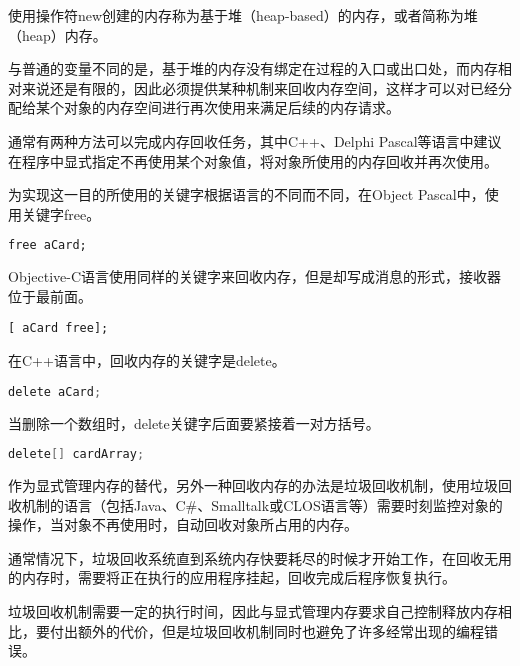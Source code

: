 使用操作符new创建的内存称为基于堆（heap-based）的内存，或者简称为堆（heap）内存。

与普通的变量不同的是，基于堆的内存没有绑定在过程的入口或出口处，而内存相对来说还是有限的，因此必须提供某种机制来回收内存空间，这样才可以对已经分配给某个对象的内存空间进行再次使用来满足后续的内存请求。

通常有两种方法可以完成内存回收任务，其中C++、Delphi Pascal等语言中建议在程序中显式指定不再使用某个对象值，将对象所使用的内存回收并再次使用。

为实现这一目的所使用的关键字根据语言的不同而不同，在Object Pascal中，使用关键字free。

\begin{lstlisting}[language=Pascal]
free aCard;
\end{lstlisting}

Objective-C语言使用同样的关键字来回收内存，但是却写成消息的形式，接收器位于最前面。


\begin{lstlisting}[language={[Objective]C}]
[ aCard free];
\end{lstlisting}


在C++语言中，回收内存的关键字是delete。


\begin{lstlisting}[language=Java]
delete aCard;
\end{lstlisting}

当删除一个数组时，delete关键字后面要紧接着一对方括号。



\begin{lstlisting}[language=Java]
delete[] cardArray;
\end{lstlisting}


作为显式管理内存的替代，另外一种回收内存的办法是垃圾回收机制，使用垃圾回收机制的语言（包括Java、C\#、Smalltalk或CLOS语言等）需要时刻监控对象的操作，当对象不再使用时，自动回收对象所占用的内存。

通常情况下，垃圾回收系统直到系统内存快要耗尽的时候才开始工作，在回收无用的内存时，需要将正在执行的应用程序挂起，回收完成后程序恢复执行。

垃圾回收机制需要一定的执行时间，因此与显式管理内存要求自己控制释放内存相比，要付出额外的代价，但是垃圾回收机制同时也避免了许多经常出现的编程错误。

